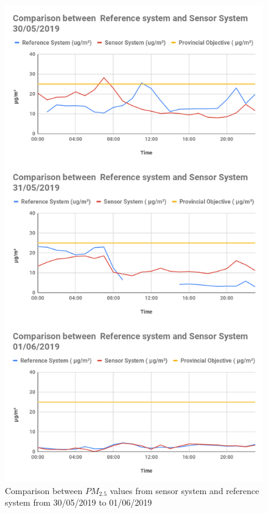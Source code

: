 \begin{figure}[h]
  \begin{center}
  \includegraphics[scale=0.43]{images/figure100.png}
  \end{center}
  \caption{Comparison between $PM_{2.5}$ values from sensor system and reference system from 30/05/2019 to 01/06/2019}
\label{PM2.5}
\hspace{1 cm}
\end{figure}
\clearpage


